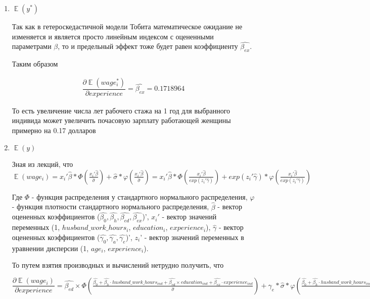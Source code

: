 \documentclass[a4paper,12pt]{article}
\DeclareMathOperator{\EX}{\mathbb{E}}%
\begin{document}
\begin{enumerate}[label=\Alph*)]
	
	\item $\EX(y^*)$
	
	Так как в гетероскедастичной модели Тобита математическое ожидание не изменяется и является просто линейным индексом с оцененными параметрами $\beta$, то и предельный эффект тоже будет равен коэффициенту $\hat{\beta_{ex}}$.
	
	Таким образом
	
	\begin{align*}
		\dfrac{\partial \EX (wage_i^*)}{\partial experience}=\hat{\beta_{ex}}  = 0.1718964
	\end{align*}
	
	То есть увеличение числа лет рабочего стажа на 1 год для выбранного индивида может увеличить почасовую зарплату работающей женщины примерно на 0.17 долларов

	
	\item $\EX(y)$
	
	Зная из лекций, что 
	$\EX(wage_i) = x_i'\hat{\beta}*\Phi(\frac{x_i'\hat{\beta}}{\hat{\sigma}}) + \hat{\sigma}*\varphi(\frac{x_i'\hat{\beta}}{\hat{\sigma}}) = x_i'\hat{\beta}*\Phi(\frac{x_i'\hat{\beta}}{exp(z_i'\hat{\gamma})}) + exp(z_i'\hat{\gamma})*\varphi(\frac{x_i'\hat{\beta}}{exp(z_i'\hat{\gamma})})$
	
	Где  $\Phi$ - функция распределения у стандартного нормального распределения, $\varphi$ - функция плотности стандартного нормального распределения, 
	$\hat{\beta}$ - вектор оцененных коэффициентов ($\hat{\beta_0}, \hat{\beta_h}, \hat{\beta_{ed}}, \hat{\beta_{ex}}$)', $x_i'$  -  вектор значений переменных (1, $husband\_work\_hours_i$, $education_i$, $experience_i$),
	$\hat{\gamma}$ - вектор оцененных коэффициентов ($\hat{\gamma_0}, \hat{\gamma_a}, \hat{\gamma_e}$)',
	$z_i$'  -  вектор значений переменных в уравнении дисперсии (1, $age_i$, $experience_i$).  
	
	 То путем взятия производных и вычислений нетрудно получить, что
	 
	 $\dfrac{\partial \EX (wage_i)}{\partial experience}=\hat{\beta_{ed}}\times \Phi \left(\frac{\hat{\beta_0}+\hat{\beta_h} \cdot husband\_work\_hours_{ind}  +\hat{\beta_{ed} }\times education_{ind}+ \hat{\beta_{ex} }\cdot experience_{ind}}{\hat{\sigma} }\right) + \gamma_e*\hat{\sigma}*\varphi\left(\frac{\hat{\beta_0}+\hat{\beta_h} \cdot husband\_work\_hours_{ind}  +\hat{\beta_{ed} }\times education_{ind}+ \hat{\beta_{ex} }\cdot experience_{ind}}{\hat{\sigma} }\right) = 0.05877214$
	

\end{enumerate}
\end{document}
